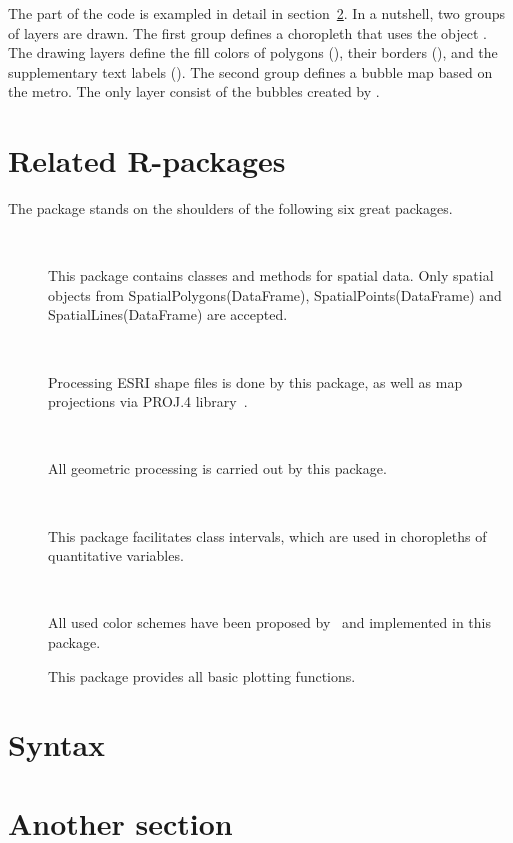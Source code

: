 The  part of the code is exampled in detail in section~\ref{syntax}. In a nutshell, two groups of layers are drawn. The first group defines a choropleth that uses the  object . The drawing layers define the fill colors of polygons (), their borders (), and the supplementary text labels (). The second group defines a bubble map based on the  metro. The only layer consist of the bubbles created by .



\section{Related R-packages}
The  package stands on the shoulders of the following six great packages.

\begin{description}
\item[~\citep{sp1, sp2}] This package contains classes and methods for spatial data. Only spatial objects from SpatialPolygons(DataFrame), SpatialPoints(DataFrame) and SpatialLines(DataFrame) are accepted.
\item[~\citep{rgdal}] Processing ESRI shape files is done by this package, as well as map projections via PROJ.4 library~\citep{proj4}.
\item[~\citep{rgeos}] All geometric processing is carried out by this package.
\item[~\citep{classInt}] This package facilitates class intervals, which are used in choropleths of quantitative variables.
\item[~\citep{classInt}] All used color schemes have been proposed by~\citet{brewer03} and implemented in this package.
\item[] This package provides all basic plotting functions.
\end{description}


\section{Syntax}\label{syntax}


%

\section{Another section}

